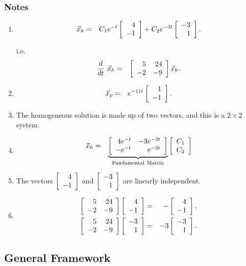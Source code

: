 \begin{frame}[allowframebreaks]
  \frametitle{Notes}

  \begin{enumerate}
  \item
    \begin{eqnarray*}
      \vec{x}_h & = & C_1 e^{-t} \vecTwo{4}{-1} 
      + C_2 e^{-3t} \vecTwo{-3}{1}.
    \end{eqnarray*}


    i.e.
    \begin{eqnarray*}
      \deriv{~}{t} \vec{x}_h & = & \arrayTwo{5}{24}{-2}{-9} \vec{x}_h.
    \end{eqnarray*}

  \item
    \begin{eqnarray*}
      \vec{x}_p & = & e^{-11t} \vecTwo{1}{-1}.
    \end{eqnarray*}

  \item The homogeneous solution is made up of two vectors, and this
    is a $2\times 2$ system.

  \item 
    \begin{eqnarray*}
      \vec{x}_h & = &
      \underbrace{\arrayTwo{4e^{-t}}{-3e^{-3t}}{-e^{-t}}{e^{-3t}}}_{\mathrm{Fundamental~Matrix}}
      \vecTwo{C_1}{C_2} 
    \end{eqnarray*}

  \item The vectors $\vecTwo{4}{-1}$ and $\vecTwo{-3}{1}$ are linearly
    independent.

  \item
    \begin{eqnarray*}
      \arrayTwo{5}{24}{-2}{-9} \vecTwo{4}{-1} & = & - \vecTwo{4}{-1}, \\
      \arrayTwo{5}{24}{-2}{-9} \vecTwo{-3}{1} & = & -3 \vecTwo{-3}{1}.
    \end{eqnarray*}



  \end{enumerate}

\end{frame}

\subsection{General Framework}

